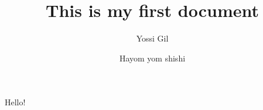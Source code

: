 \documentclass{article}
\title{This is my first document}
\author{Yossi Gil}
\date{Hayom yom shishi}
\begin{document}
\maketitle
Hello!
\end{document}
